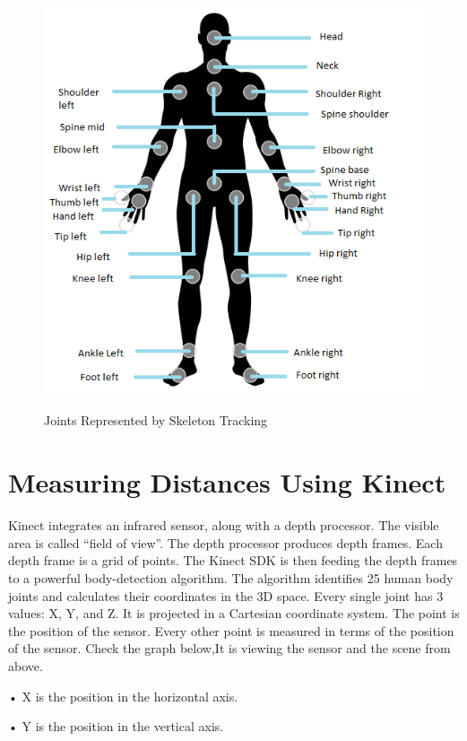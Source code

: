 \begin{figure}[H]
\centering
{\includegraphics[scale=0.85]{figbodjoints.png}}
\caption{Joints Represented by Skeleton Tracking}
\end{figure}
\newpage

\section{Measuring Distances Using Kinect } \label{ Measuring Distances Using Kinect}             
\noindent Kinect integrates an infrared sensor, along with a depth processor. The visible area is called “field of view”. The depth processor produces depth frames. Each depth frame is a grid of points. The Kinect SDK is then feeding the depth frames to a powerful body-detection algorithm. The algorithm identifies 25 human body joints and calculates their coordinates in the 3D space. 
\noindent Every single joint has 3 values: X, Y, and Z. It is projected in a Cartesian coordinate system. The  point is the position of the sensor. Every other point is measured in terms of the position of the sensor. Check the graph below,It is viewing the sensor and the scene from above.

•	X is the position in the horizontal axis.

•	Y is the position in the vertical axis.

